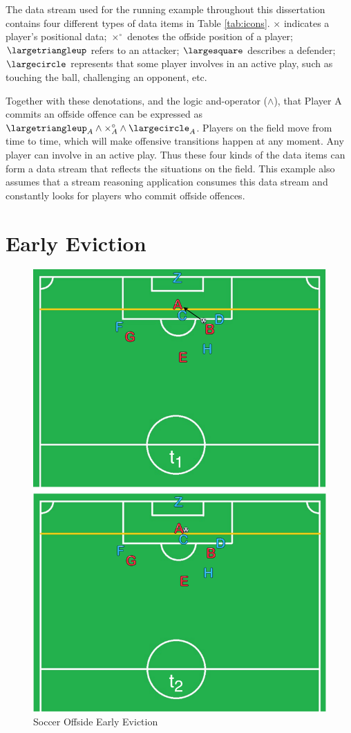 The data stream used for the running example throughout this dissertation contains four different types of data items in Table \ref{tab:icons}.
$\times$ indicates a player's positional data;
$\times^{\circ}$ denotes the offside position of a player; 
$\largetriangleup$ refers to an attacker;
$\largesquare$ describes a defender;
$\largecircle$ represents that some player involves in an active play, such as touching the ball, challenging an opponent, etc.

Together with these denotations, and the logic and-operator ($\wedge$), that Player A commits an offside offence can be expressed as
$\largetriangleup_{A} \wedge \times^{\circ}_{A} \wedge \largecircle_{A}$. 
Players on the field move from time to time, which will make offensive transitions happen at any moment.
Any player can involve in an active play. 
Thus these four kinds of the data items can form a data stream that reflects the situations on the field.
This example also assumes that a stream reasoning application consumes this data stream and constantly looks for players who commit offside offences. 
%
\section{Early Eviction}

\begin{figure}[!htbp]
	\centering
	\includegraphics[width=5in]{img/1-seeh.pdf}
	\caption{Soccer Offside Early Eviction}
	\label{fig:1-seeh} 
\end{figure}

